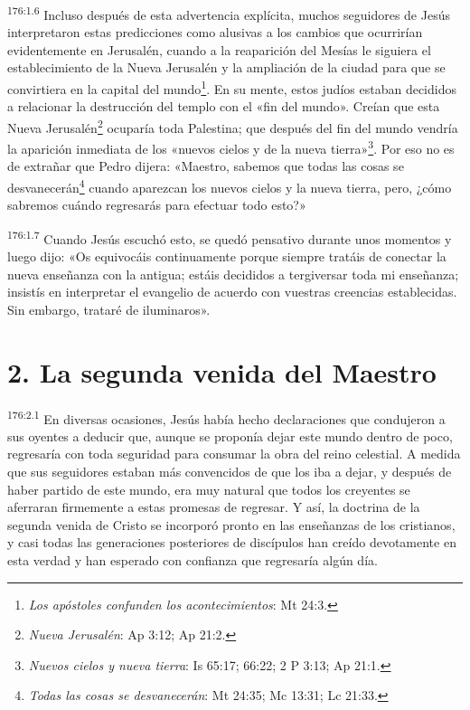 \par 
\textsuperscript{176:1.6} Incluso después de esta advertencia explícita, muchos seguidores de Jesús interpretaron estas predicciones como alusivas a los cambios que ocurrirían evidentemente en Jerusalén, cuando a la reaparición del Mesías le siguiera el establecimiento de la Nueva Jerusalén y la ampliación de la ciudad para que se convirtiera en la capital del mundo\footnote{\textit{Los apóstoles confunden los acontecimientos}: Mt 24:3.}. En su mente, estos judíos estaban decididos a relacionar la destrucción del templo con el «fin del mundo». Creían que esta Nueva Jerusalén\footnote{\textit{Nueva Jerusalén}: Ap 3:12; Ap 21:2.} ocuparía toda Palestina; que después del fin del mundo vendría la aparición inmediata de los «nuevos cielos y de la nueva tierra»\footnote{\textit{Nuevos cielos y nueva tierra}: Is 65:17; 66:22; 2 P 3:13; Ap 21:1.}. Por eso no es de extrañar que Pedro dijera: «Maestro, sabemos que todas las cosas se desvanecerán\footnote{\textit{Todas las cosas se desvanecerán}: Mt 24:35; Mc 13:31; Lc 21:33.} cuando aparezcan los nuevos cielos y la nueva tierra, pero, ¿cómo sabremos cuándo regresarás para efectuar todo esto?»

\par 
\textsuperscript{176:1.7} Cuando Jesús escuchó esto, se quedó pensativo durante unos momentos y luego dijo: «Os equivocáis continuamente porque siempre tratáis de conectar la nueva enseñanza con la antigua; estáis decididos a tergiversar toda mi enseñanza; insistís en interpretar el evangelio de acuerdo con vuestras creencias establecidas. Sin embargo, trataré de iluminaros».

\section*{2. La segunda venida del Maestro}
\par 
\textsuperscript{176:2.1} En diversas ocasiones, Jesús había hecho declaraciones que condujeron a sus oyentes a deducir que, aunque se proponía dejar este mundo dentro de poco, regresaría con toda seguridad para consumar la obra del reino celestial. A medida que sus seguidores estaban más convencidos de que los iba a dejar, y después de haber partido de este mundo, era muy natural que todos los creyentes se aferraran firmemente a estas promesas de regresar. Y así, la doctrina de la segunda venida de Cristo se incorporó pronto en las enseñanzas de los cristianos, y casi todas las generaciones posteriores de discípulos han creído devotamente en esta verdad y han esperado con confianza que regresaría algún día.

